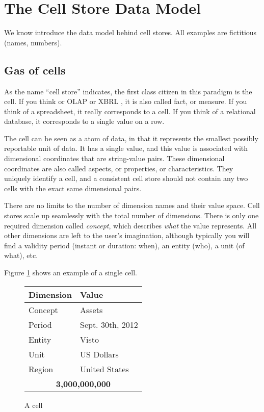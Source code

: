 \documentclass{vldb}
\begin{document}
\section{The Cell Store Data Model}
\label{section-data-model}

We know introduce the data model behind cell stores. All examples are fictitious (names, numbers).

\subsection{Gas of cells}

As the name ``cell store'' indicates, the first class citizen in this paradigm is the cell. If you think or OLAP or XBRL \cite{XBRL}, it is also called fact, or measure. If you think of a spreadsheet, it really corresponds to a cell. If you think of a relational database, it corresponds to a single value on a row.

The cell can be seen as a atom of data, in that it represents the smallest possibly reportable unit of data. It has a single value, and this value is associated with dimensional coordinates that are string-value pairs. These dimensional coordinates are also called aspects, or properties, or characteristics. They uniquely identify a cell, and a consistent cell store should not contain any two cells with the exact same dimensional pairs.

There are no limits to the number of dimension names and their value space. Cell stores scale up seamlessly with the total number of dimensions. There is only one required dimension called \emph{concept}, which describes \emph{what} the value represents. All other dimensions are left to the user's imagination, although typically you will find a validity period (instant or duration: when), an entity (who), a unit (of what), etc.

Figure \ref{fig-cell} shows an example of a single cell.

\begin{figure}
\caption{A cell}
\label{fig-cell}
\begin{tabular}{|l|l|}
\hline
Dimension & Value \\
\hline
Concept & Assets \\
Period & Sept. 30th, 2012 \\
Entity & Visto \\
Unit & US Dollars \\
Region & United States \\
\hline
\multicolumn{2}{|c|}{\textbf{3,000,000,000}} \\
\hline
\end{tabular}
\end{figure}
\end{document}

